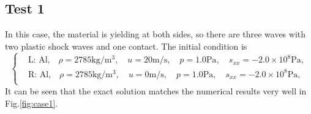 \documentclass[review]{elsarticle}
\numberwithin{equation}{section}
\numberwithin{table}{section}
\begin{document}
\subsection{Test 1}
In this case, the material is yielding at both sides, so there are three waves with two plastic shock waves and one contact.
The initial condition is
\begin{equation}
 \left\{ \begin{aligned}
&	 \text{L: Al,}\quad  \rho = 2785 \text{kg}/\text{m}^3, \quad  u = 20\text{m}/\text{s}, \quad  p = 1.0\text{Pa}, \quad  s_{xx}=-2.0\times 10^8 \text{Pa},\\
&	 \text{R: Al,}\quad  \rho = 2785 \text{kg}/\text{m}^3, \quad  u = 0\text{m}/\text{s}, \quad  p = 1.0\text{Pa}, \quad  s_{xx}=-2.0\times 10^8 \text{Pa},\\
   \end{aligned}
 \right.
\end{equation}
It can be seen that the exact solution matches the numerical results very well in Fig.\ref{fig:case1}.
\end{document}
